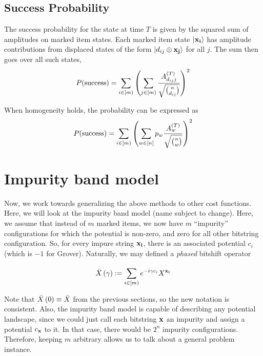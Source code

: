 \documentclass[11pt]{article}
\begin{document}
\subsection{Success Probability}

The success probability for the state at time $T$ is given by the squared sum of amplitudes on marked item states. Each marked item state $|\mathbf{x_i}\rangle$ has amplitude contributions from displaced states of the form $|d_{ij}\oplus \mathbf{x_j}\rangle$ for all $j$. The sum then goes over all such states,
\begin{equation}
  \label{eq:probsuccess}
  P(\text{success}) = \sum\limits_{i\in [m)}^{}\left(\sum\limits_{j\in [m)}^{}\frac{A^{(T)}_{d_{ij} j}}{\sqrt{\binom{n}{d_{ij}}}}\right)^2
\end{equation}

When homogeneity holds, the probability can be expressed as
\begin{equation}
  \label{eq:probsuccesshom}
  P(\text{success}) = \sum\limits_{i\in [m)}^{}\left(\sum\limits_{w\in [n]}^{}p_w\frac{A^{(T)}_{w}}{\sqrt{\binom{n}{w}}}\right)^2
\end{equation}

\section{Impurity band model}
\label{sec:imp}

Now, we work towards generalizing the above methods to other cost functions. Here, we will look at the impurity band model (name subject to change). Here, we assume that instead of $m$ marked items, we now have $m$ ``impurity'' configurations for which the potential is non-zero, and zero for all other bitstring configuration. So, for every impure string $\mathbf{x_i}$, there is an associated potential $c_i$ (which is $-1$ for Grover). Naturally, we may defined a \emph{phased} bitshift operator

\begin{equation}
\bar{X}\left(\gamma\right) := \sum\limits_{i\in[m)}^{}e^{-i\gamma c_i}X^{\mathbf{x_i}} 
\end{equation}

Note that $\bar{X}\left(0\right) \equiv \bar{X}$ from the previous sections, so the new notation is consistent. Also, the impurity band model is capable of describing any potential landscape, since we could just call each bitstring $\mathbf{x}$ an impurity and assign a potential $c_{\mathbf{x}}$ to it. In that case, there would be $2^n$ impurity configurations. Therefore, keeping $m$ arbitrary allows us to talk about a general problem instance.
\end{document}
